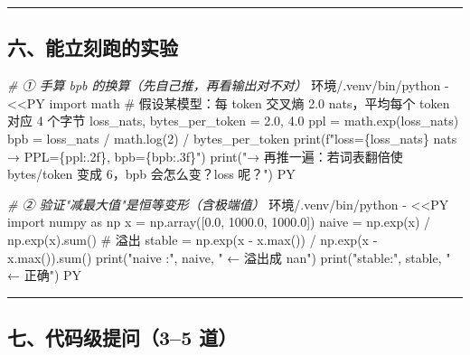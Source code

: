 \documentclass[
  chinese,
  11pt,
]{ctexart}
\newenvironment{Shaded}{}{}
\newcommand{\AttributeTok}[1]{\textcolor[rgb]{0.49,0.56,0.16}{#1}}
\newcommand{\CommentTok}[1]{\textcolor[rgb]{0.38,0.63,0.69}{\textit{#1}}}
\newcommand{\ExtensionTok}[1]{#1}
\newcommand{\OperatorTok}[1]{\textcolor[rgb]{0.40,0.40,0.40}{#1}}
\newcommand{\StringTok}[1]{\textcolor[rgb]{0.25,0.44,0.63}{#1}}
\begin{document}
\begin{center}\rule{0.5\linewidth}{0.5pt}\end{center}

\subsection{六、能立刻跑的实验}\label{ux516dux80fdux7acbux523bux8dd1ux7684ux5b9eux9a8c}

\begin{Shaded}
\begin{Highlighting}[]
\CommentTok{\# ① 手算 bpb 的换算（先自己推，再看输出对不对）}
\ExtensionTok{环境/.venv/bin/python} \AttributeTok{{-}} \OperatorTok{\textless{}\textless{}\textquotesingle{}PY\textquotesingle{}}
\StringTok{import math}
\StringTok{\# 假设某模型：每 token 交叉熵 2.0 nats，平均每个 token 对应 4 个字节}
\StringTok{loss\_nats, bytes\_per\_token = 2.0, 4.0}
\StringTok{ppl = math.exp(loss\_nats)}
\StringTok{bpb = loss\_nats / math.log(2) / bytes\_per\_token}
\StringTok{print(f"loss=\{loss\_nats\} nats → PPL=\{ppl:.2f\}, bpb=\{bpb:.3f\}")}
\StringTok{print("→ 再推一遍：若词表翻倍使 bytes/token 变成 6，bpb 会怎么变？loss 呢？")}
\OperatorTok{PY}

\CommentTok{\# ② 验证"减最大值"是恒等变形（含极端值）}
\ExtensionTok{环境/.venv/bin/python} \AttributeTok{{-}} \OperatorTok{\textless{}\textless{}\textquotesingle{}PY\textquotesingle{}}
\StringTok{import numpy as np}
\StringTok{x = np.array([0.0, 1000.0, 1000.0])}
\StringTok{naive = np.exp(x) / np.exp(x).sum()      \# 溢出}
\StringTok{stable = np.exp(x {-} x.max()) / np.exp(x {-} x.max()).sum()}
\StringTok{print("naive :", naive, " ← 溢出成 nan")}
\StringTok{print("stable:", stable, " ← 正确")}
\OperatorTok{PY}
\end{Highlighting}
\end{Shaded}

\begin{center}\rule{0.5\linewidth}{0.5pt}\end{center}

\subsection{七、代码级提问（3--5 道）}\label{ux4e03ux4ee3ux7801ux7ea7ux63d0ux95ee35-ux9053}
\end{document}
